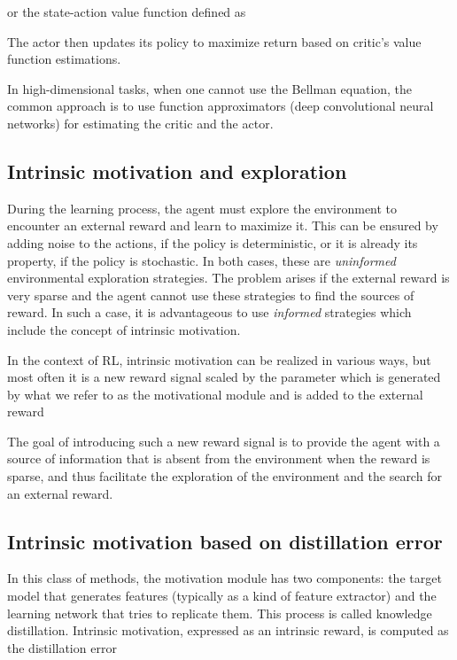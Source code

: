 \documentclass[a4paper,11pt]{elsarticle}
\begin{document}
or the state-action value function  defined as

The actor then updates its policy to maximize return  based on critic's value function estimations.

In high-dimensional tasks, when one cannot use the Bellman equation, the common approach is to use function approximators (deep convolutional neural networks) for estimating the critic and the actor.

\subsection{Intrinsic motivation and exploration}

During the learning process, the agent must explore the environment to encounter an external reward and learn to maximize it. This can be ensured by adding noise to the actions, if the policy is deterministic, or it is already its property, if the policy is stochastic. In both cases, these are {\it uninformed} environmental exploration strategies. The problem arises if the external reward is very sparse and the agent cannot use these strategies to find the sources of reward. In such a case, it is advantageous to use {\it informed} strategies which include the concept of intrinsic motivation.

In the context of RL, intrinsic motivation can be realized in various ways, but most often it is a new reward signal  scaled by the parameter  which is generated by what we refer to as the motivational module and is added to the external reward 

The goal of introducing such a new reward signal is to provide the agent with a source of information that is absent from the environment when the reward is sparse, and thus facilitate the exploration of the environment and the search for an external reward.

\subsection{Intrinsic motivation based on distillation error}

In this class of methods, the motivation module has two components: the target model  that generates features (typically as a kind of feature extractor) and the learning network  that tries to replicate them. This process is called knowledge distillation. Intrinsic motivation, expressed as an intrinsic reward, is computed as the distillation error
\end{document}
